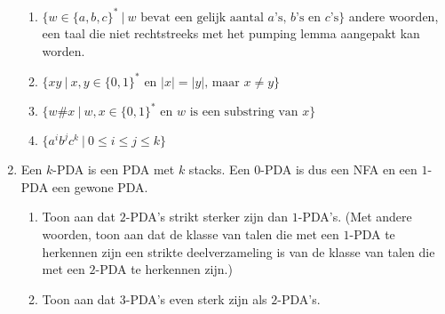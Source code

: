 \documentclass[a4paper]{article}
\begin{document}
\begin{enumerate}
\begin{enumerate}
         \item $\{ w \in \{a,b,c\}^* \ | \ \text{$w$ bevat een gelijk aantal $a$'s, $b$'s en $c$'s} \}$
andere woorden, een taal die niet rechtstreeks met het pumping lemma aangepakt kan worden.
         \item $\{ xy \ | \ \text{$x,y \in \{0,1\}^*$ en $|x| = |y|$, maar $x \neq y$} \}$
         \item $\{ w \# x \ | \ \text{$w,x \in \{0,1\}^*$ en $w$ is een substring van $x$} \}$
			\item $\{a^ib^jc^k \ | \ 0 \leq i \leq j \leq k \}$
      \end{enumerate}
	\item Een $k$-PDA is een PDA met $k$ stacks. Een $0$-PDA is dus een NFA en een $1$-PDA een gewone PDA.
   \begin{enumerate}
      \item Toon aan dat $2$-PDA's strikt sterker zijn dan $1$-PDA's. (Met andere woorden, toon aan dat de klasse van
talen die met een $1$-PDA te herkennen zijn een strikte deelverzameling is van de klasse van talen die met een $2$-PDA
te herkennen zijn.)
      \item Toon aan dat $3$-PDA's even sterk zijn als $2$-PDA's.
   \end{enumerate}


\end{enumerate}
\end{document}
